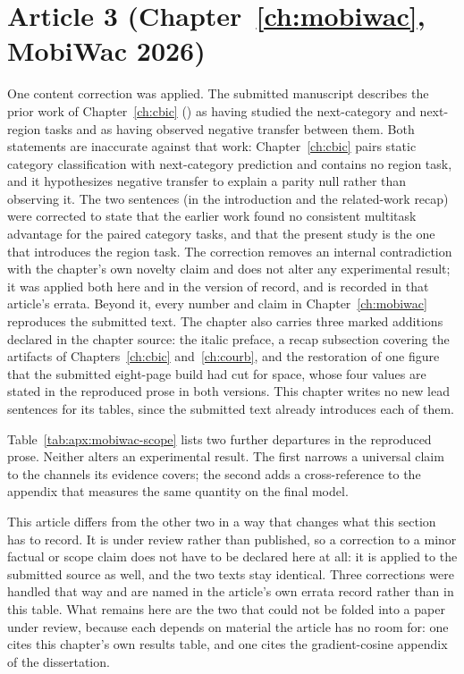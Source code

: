 \section{Article 3 (Chapter~\ref{ch:mobiwac}, MobiWac 2026)}
\label{apx:errata:mobiwac}

One content correction was applied. The submitted manuscript describes the prior work
of Chapter~\ref{ch:cbic} (\cite{silva2025mtlnet}) as having studied the next-category
and next-region tasks and as having observed negative transfer between them. Both
statements are inaccurate against that work: Chapter~\ref{ch:cbic} pairs static category
classification with next-category prediction and contains no region task, and it
hypothesizes negative transfer to explain a parity null rather than observing it. The
two sentences (in the introduction and the related-work recap) were corrected to state
that the earlier work found no consistent multitask advantage for the paired category
tasks, and that the present study is the one that introduces the region task. The
correction removes an internal contradiction with the chapter's own novelty claim and
does not alter any experimental result; it was applied both here and in the version of
record, and is recorded in that article's errata. Beyond it, every number and claim in
Chapter~\ref{ch:mobiwac} reproduces the submitted text. The chapter also carries three
marked additions declared in the chapter source: the italic preface, a recap subsection
covering the artifacts of Chapters~\ref{ch:cbic} and~\ref{ch:courb}, and the restoration
of one figure that the submitted eight-page build had cut for space, whose four values
are stated in the reproduced prose in both versions. This chapter writes no new lead
sentences for its tables, since the submitted text already introduces each of them.

Table~\ref{tab:apx:mobiwac-scope} lists two further departures in the reproduced prose.
Neither alters an experimental result. The first narrows a universal claim to the channels its
evidence covers; the second adds a cross-reference to the appendix that measures the same quantity
on the final model.

This article differs from the other two in a way that changes what this section has to record.
It is under review rather than published, so a correction to a minor factual or scope claim
does not have to be declared here at all: it is applied to the submitted source as well, and
the two texts stay identical. Three corrections were handled that way and are named in the
article's own errata record rather than in this table.
What remains here are the two that could
not be folded into a paper under review, because each depends on material the article has no
room for: one cites this chapter's own results table, and one cites the gradient-cosine appendix of the
dissertation.

